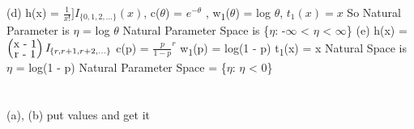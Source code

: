 \documentclass{report}
\begin{document}
\newline
(d) h(x) = $\frac{1}{x!}]\textit{I}_{\{0, 1, 2, ...\}}(x)$, c(\textbf{$\theta$}) = $e^{-\theta}$
, w{\textsubscript{1}}($\theta$) = log $\theta$, $t_{1}(x) = x$
\newline
So Natural Parameter is $\eta$ = log $\theta$ 
\newline
Natural Parameter Space is \{$\eta$: -$\infty$ < $\eta$ < $\infty$\}
\newline
(e) h(x) = $\left(\stackanchor{x - 1}{r - 1}\right)\textit{I}_{\{r, r+1, r+2, ... \}}$
c(p) = $\frac{p}{1 - p}^r$
w\textsubscript{1}(p) = log(1 - p)
\newline
t\textsubscript{1}(x) = x
\newline
Natural Space is $\eta$ = log(1 - p)
\newline
Natural Parameter Space = \{$\eta$: $\eta$ < 0\}
\newline
\section{}
(a), (b) put values and get it
\newline
\end{document}
